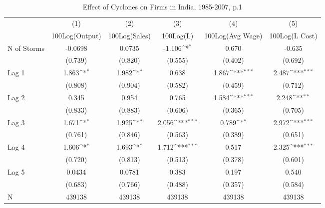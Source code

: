 \begin{table}[htbp]\centering
\def\sym#1{\ifmmode^{#1}\else\(^{#1}\)\fi}
\caption{Effect of Cyclones on Firms in India, 1985-2007, p.1}
\begin{tabular}{l*{5}{c}}
\toprule
                &\multicolumn{1}{c}{(1)}&\multicolumn{1}{c}{(2)}&\multicolumn{1}{c}{(3)}&\multicolumn{1}{c}{(4)}&\multicolumn{1}{c}{(5)}\\
                &\multicolumn{1}{c}{100Log(Output)}&\multicolumn{1}{c}{100Log(Sales)}&\multicolumn{1}{c}{100Log(L)}&\multicolumn{1}{c}{100Log(Avg Wage)}&\multicolumn{1}{c}{100Log(L Cost)}\\
\midrule
N of Storms     &  -0.0698         &   0.0735         &   -1.106\sym{*}  &    0.670         &   -0.635         \\
                &  (0.739)         &  (0.820)         &  (0.555)         &  (0.402)         &  (0.692)         \\
\addlinespace
Lag 1           &    1.863\sym{*}  &    1.982\sym{*}  &    0.638         &    1.867\sym{***}&    2.487\sym{***}\\
                &  (0.808)         &  (0.904)         &  (0.582)         &  (0.459)         &  (0.712)         \\
\addlinespace
Lag 2           &    0.345         &    0.954         &    0.765         &    1.584\sym{***}&    2.248\sym{**} \\
                &  (0.833)         &  (0.883)         &  (0.606)         &  (0.365)         &  (0.705)         \\
\addlinespace
Lag 3           &    1.671\sym{*}  &    1.925\sym{*}  &    2.056\sym{***}&    0.789\sym{*}  &    2.972\sym{***}\\
                &  (0.761)         &  (0.846)         &  (0.563)         &  (0.389)         &  (0.651)         \\
\addlinespace
Lag 4           &    1.606\sym{*}  &    1.693\sym{*}  &    1.712\sym{***}&    0.517         &    2.325\sym{***}\\
                &  (0.720)         &  (0.813)         &  (0.513)         &  (0.378)         &  (0.601)         \\
\addlinespace
Lag 5           &   0.0434         &   0.0781         &    0.383         &    0.197         &    0.540         \\
                &  (0.683)         &  (0.766)         &  (0.488)         &  (0.357)         &  (0.584)         \\
\midrule
N               &   439138         &   439138         &   439138         &   439138         &   439138         \\

\end{tabular}
\end{table}
